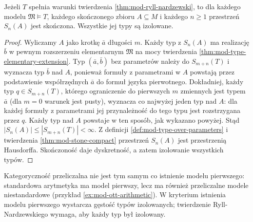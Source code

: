 \begin{wniosek}
\label{cor:mod-rn-finite-parameters}
Jeżeli $T$ spełnia warunki twierdzenia
\ref{thm:mod-ryll-nardzewski}, to dla każdego
modelu $\mathfrak M\models T$, każdego
skończonego zbioru $A\subseteq M$ i każdego
$n\geq1$ przestrzeń $S_n(A)$ jest skończona.
Wszystkie jej typy są izolowane.
\end{wniosek}
\begin{proof}
Wyliczamy $A$ jako krotkę $\bar a$ długości $m$.
Każdy typ z $S_n(A)$ ma realizację $\bar b$
w pewnym rozszerzeniu elementarnym $\mathfrak M$
na mocy twierdzenia
\ref{thm:mod-type-elementary-extension}.
Typ $(\bar a,\bar b)$ bez parametrów należy
do $S_{m+n}(T)$ i wyznacza typ $\bar b$ nad $A$,
ponieważ formuły z parametrami w $A$
powstają przez podstawienie współrzędnych
$\bar a$ do formuł języka pierwotnego.
Dokładniej, każdy typ $q\in S_{m+n}(T)$, którego
ograniczenie do pierwszych $m$ zmiennych jest typem
$\bar a$ (dla $m=0$ warunek jest pusty), wyznacza
co najwyżej jeden typ nad $A$: dla każdej formuły
z parametrami jej przynależność do tego typu jest
rozstrzygana przez $q$. Każdy typ nad $A$ powstaje
w ten sposób, jak wykazano powyżej. Stąd
$|S_n(A)|\leq |S_{m+n}(T)|<\infty$.
Z definicji \ref{def:mod-type-over-parameters}
i twierdzenia \ref{thm:mod-stone-compact}
przestrzeń $S_n(A)$ jest przestrzenią Hausdorffa.
Skończoność daje dyskretność, a zatem
izolowanie wszystkich typów.
\end{proof}

Kategoryczność przeliczalna nie jest tym samym
co istnienie modelu pierwszego: standardowa
arytmetyka ma model pierwszy, lecz ma również
przeliczalne modele niestandardowe
(przykład \ref{ex:mod-ott-arithmetic}).
W kryterium istnienia modelu pierwszego
wystarcza gęstość typów izolowanych; twierdzenie
Ryll-Nardzewskiego wymaga, aby każdy typ
był izolowany.
